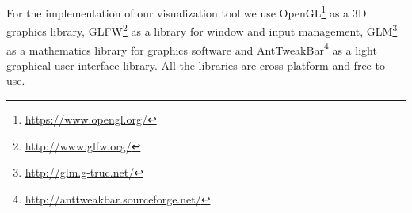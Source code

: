 

For the implementation of our visualization tool we use OpenGL\footnote{\url{https://www.opengl.org/}} as a 3D graphics library, GLFW\footnote{\url{http://www.glfw.org/}} as a library for window and input management, GLM\footnote{\url{http://glm.g-truc.net/}} as a mathematics library for graphics software and AntTweakBar\footnote{\url{http://anttweakbar.sourceforge.net/}} as a light graphical user interface library. All the libraries are cross-platform and free to use.

